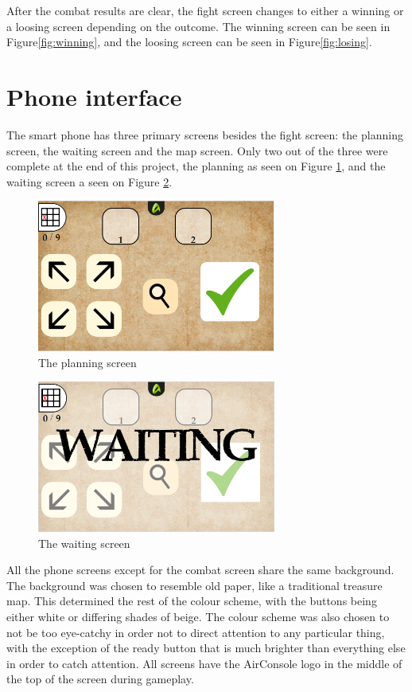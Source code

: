 After the combat results are clear, the fight screen changes to either a winning or a loosing screen depending on the outcome. The winning screen can be seen in Figure\ref{fig:winning}, and the loosing screen can be seen in Figure\ref{fig:losing}.

\section{Phone interface}
The smart phone has three primary screens besides the fight screen: the planning screen, the waiting screen and the map screen. Only two out of the three were complete at the end of this project, the planning as seen on Figure \ref{fig:plan}, and the waiting screen a seen on Figure \ref{fig:wait}. 

\begin{figure}[h!]
	\centering
	\includegraphics[width=0.7\textwidth]{figures/planningScreen.png}
	\caption{The planning screen}
	\label{fig:plan}
\end{figure}


\begin{figure}[h!]
	\centering
	\includegraphics[width=0.7\textwidth]{figures/waitingScreen.png}
	\caption{The waiting screen}
	\label{fig:wait}
\end{figure}

All the phone screens except for the combat screen share the same background. The background was chosen to resemble old paper, like a traditional treasure map. This determined the rest of the colour scheme, with the buttons being either white or differing shades of beige. The colour scheme was also chosen to not be too eye-catchy in order not to direct attention to any particular thing, with the exception of the ready button that is much brighter than everything else in order to catch attention. All screens  have the AirConsole logo in the middle of the top of the screen during gameplay. 

